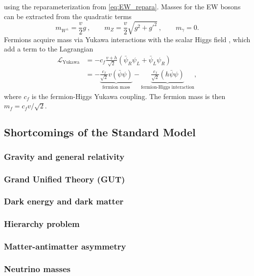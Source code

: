 \documentclass[../thesis.tex]{subfiles}
\begin{document}
using the reparameterization from \autoref{eq:EW_repara}. Masses for the \acs{EW} bosons can be extracted from the quadratic terms
\begin{equation}
m_{W^\pm} = \frac{v}{2}g\:, \qquad m_Z = \frac{v}{2}\sqrt{g^2+g'^2}\:, \qquad m_\gamma = 0.
\end{equation}
Fermions acquire mass via Yukawa interactions with the scalar Higgs field \citep{theory:higgs_physics}, which add a term to the Lagrangian
\begin{equation}
\begin{aligned}
\mathcal{L}_\text{Yukawa} 
&= -c_f\frac{v+h}{\sqrt{2}}\left(\bar{\psi}_R\psi_L+\bar{\psi}_L\psi_R\right) \\
&=
- \underbrace{\frac{c_f}{\sqrt{2}}v(\bar{\psi}\psi)}_\text{fermion mass}
- \underbrace{\frac{c_f}{\sqrt{2}}(h\bar{\psi}\psi)}_\text{fermion-Higgs interaction},
\end{aligned}
\end{equation}
where $c_f$ is the fermion-Higgs Yukawa coupling. The fermion mass is then $m_f = c_f v/\sqrt{2}$.

\subsection{Shortcomings of the Standard Model}
\subsubsection*{Gravity and general relativity}
\subsubsection*{Grand Unified Theory (\acs{GUT})}
\subsubsection*{Dark energy and dark matter}
\subsubsection*{Hierarchy problem}
\subsubsection*{Matter-antimatter asymmetry}
\subsubsection*{Neutrino masses}
\end{document}

